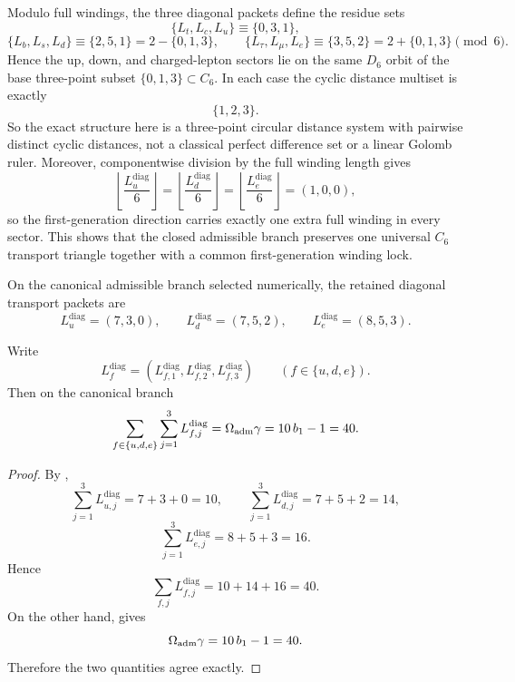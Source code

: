 \begin{remark}
Modulo full windings, the three diagonal packets define the residue sets
\[
\{L_t,L_c,L_u\}\equiv\{0,3,1\},
\]
\[
\{L_b,L_s,L_d\}\equiv\{2,5,1\}=2-\{0,1,3\},
\qquad
\{L_\tau,L_\mu,L_e\}\equiv\{3,5,2\}=2+\{0,1,3\}
\pmod 6.
\]
Hence the up, down, and charged-lepton sectors lie on the same $D_6$ orbit of the base three-point subset $\{0,1,3\}\subset C_6$. In each case the cyclic distance multiset is exactly
\[
\{1,2,3\}.
\]
So the exact structure here is a three-point circular distance system with pairwise distinct cyclic distances, not a classical perfect difference set or a linear Golomb ruler.
Moreover, componentwise division by the full winding length gives
\[
\left\lfloor\frac{L_u^{\mathrm{diag}}}{6}\right\rfloor
=
\left\lfloor\frac{L_d^{\mathrm{diag}}}{6}\right\rfloor
=
\left\lfloor\frac{L_e^{\mathrm{diag}}}{6}\right\rfloor
=(1,0,0),
\]
so the first-generation direction carries exactly one extra full winding in every sector. This
shows that the closed admissible branch preserves one universal $C_6$ transport triangle together
with a common first-generation winding lock.
\end{remark}

\begin{corollary}
\label{prin:minimal-admissible-transport-packets}
On the canonical admissible branch selected numerically, the retained diagonal transport packets
are
\[
L_u^{\mathrm{diag}}=(7,3,0),
\qquad
L_d^{\mathrm{diag}}=(7,5,2),
\qquad
L_e^{\mathrm{diag}}=(8,5,3).
\]
\end{corollary}

\begin{corollary}
\label{cor:transport-length-sum-rule}
Write
\[
L_f^{\mathrm{diag}}=(L_{f,1}^{\mathrm{diag}},L_{f,2}^{\mathrm{diag}},L_{f,3}^{\mathrm{diag}})
\qquad
(f\in\{u,d,e\}).
\]
Then on the canonical branch
\[
\sum_{f\in\{u,d,e\}}\sum_{j=1}^{3}L_{f,j}^{\mathrm{diag}}
=
\Omega_{\mathrm{adm}}\gamma
=
10\,b_1-1
=
40.
\]
\end{corollary}

\begin{proof}
By ,
\[
\sum_{j=1}^3L_{u,j}^{\mathrm{diag}}=7+3+0=10,
\qquad
\sum_{j=1}^3L_{d,j}^{\mathrm{diag}}=7+5+2=14,
\]
\[
\sum_{j=1}^3L_{e,j}^{\mathrm{diag}}=8+5+3=16.
\]
Hence
\[
\sum_{f,j}L_{f,j}^{\mathrm{diag}}=10+14+16=40.
\]
On the other hand,  gives
\[
\Omega_{\mathrm{adm}}\gamma=10\,b_1-1=40.
\]
Therefore the two quantities agree exactly.
\end{proof}


